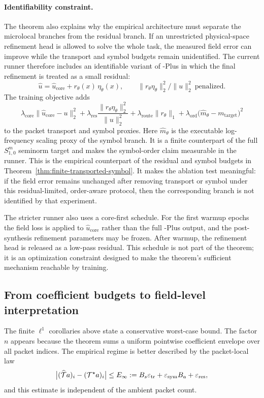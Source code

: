 \paragraph{Identifiability constraint.}
The theorem also explains why the empirical architecture must separate the microlocal branches from the residual branch. If an unrestricted physical-space refinement head is allowed to solve the whole task, the measured field error can improve while the transport and symbol budgets remain unidentified. The current runner therefore includes an identifiable variant of \MiNO-Plus in which the final refinement is treated as a small residual:
\[
\widehat u
=
\widehat u_{\mathrm{core}}
+ r_\theta(x)\, \eta_\theta(x),
\qquad
\|r_\theta\eta_\theta\|_2^2/\|u\|_2^2
\ \text{penalized}.
\]
The training objective adds
\[
\lambda_{\mathrm{core}}\|\widehat u_{\mathrm{core}}-u\|_2^2
+
\lambda_{\mathrm{res}}\frac{\|r_\theta\eta_\theta\|_2^2}{\|u\|_2^2}
+
\lambda_{\mathrm{route}}\|r_\theta\|_1
+
\lambda_{\mathrm{ord}}
\bigl(\widehat m_\theta-m_{\mathrm{target}}\bigr)^2
\]
to the packet transport and symbol proxies.  Here $\widehat m_\theta$ is the executable log-frequency scaling proxy of the symbol branch.  It is a finite counterpart of the full $S^m_{1,0}$ seminorm target and makes the symbol-order claim measurable in the runner. This is the empirical counterpart of the residual and symbol budgets in Theorem~\ref{thm:finite-transported-symbol}. It makes the ablation test meaningful: if the field error remains unchanged after removing transport or symbol under this residual-limited, order-aware protocol, then the corresponding branch is not identified by that experiment.

The stricter runner also uses a core-first schedule.  For the first warmup epochs the field loss is applied to $\widehat u_{\mathrm{core}}$ rather than the full \MiNO-Plus output, and the post-synthesis refinement parameters may be frozen.  After warmup, the refinement head is released as a low-pass residual.  This schedule is not part of the theorem; it is an optimization constraint designed to make the theorem's sufficient mechanism reachable by training.

\subsection{From coefficient budgets to field-level interpretation}
\label{sec:field-level-interpretation}

The finite $\ell^1$ corollaries above state a conservative worst-case bound. The factor $n$ appears because the theorem sums a uniform pointwise coefficient envelope over all packet indices. The empirical regime is better described by the packet-local law
\[
\bigl|(\widehat{\mathcal T}a)_i-(\mathcal T^\star a)_i\bigr|
\le
E_\infty
:=
B_s\varepsilon_{\mathrm{tr}}+\varepsilon_{\mathrm{sym}}B_a+\varepsilon_{\mathrm{res}},
\]
and this estimate is independent of the ambient packet count.


